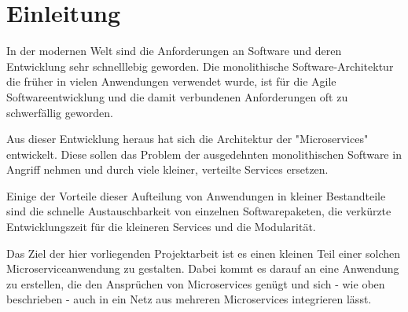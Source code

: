 
\chapter{Einleitung}
\label{ch:Einleitung}

In der modernen Welt sind die Anforderungen an Software und deren Entwicklung sehr schnelllebig geworden. Die monolithische Software-Architektur die früher in vielen Anwendungen verwendet wurde, ist für die Agile Softwareentwicklung und die damit verbundenen Anforderungen oft zu schwerfällig geworden.

Aus dieser Entwicklung heraus hat sich die Architektur der "Microservices" entwickelt. Diese sollen das Problem der ausgedehnten monolithischen Software in Angriff nehmen und durch viele kleiner, verteilte Services ersetzen.

Einige der Vorteile dieser Aufteilung von Anwendungen in kleiner Bestandteile sind die schnelle Austauschbarkeit von einzelnen Softwarepaketen, die verkürzte Entwicklungszeit für die kleineren Services und die Modularität.

Das Ziel der hier vorliegenden Projektarbeit ist es einen kleinen Teil einer solchen Microserviceanwendung zu gestalten. Dabei kommt es darauf an eine Anwendung zu erstellen, die den Ansprüchen von Microservices genügt und sich - wie oben beschrieben - auch in ein Netz aus mehreren Microservices integrieren lässt.